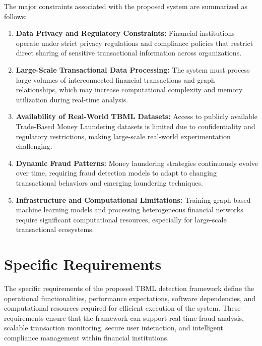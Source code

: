 The major constraints associated with the proposed system are summarized as follows:

\renewcommand{\theenumi}{\roman{enumi}}\renewcommand{\labelenumi}{\textbf{ (\theenumi)}}%
\begin{enumerate}

\item \textbf{Data Privacy and Regulatory Constraints:}  
Financial institutions operate under strict privacy regulations and compliance policies that restrict direct sharing of sensitive transactional information across organizations.

\item \textbf{Large-Scale Transactional Data Processing:}  
The system must process large volumes of interconnected financial transactions and graph relationships, which may increase computational complexity and memory utilization during real-time analysis.

\item \textbf{Availability of Real-World TBML Datasets:}  
Access to publicly available Trade-Based Money Laundering datasets is limited due to confidentiality and regulatory restrictions, making large-scale real-world experimentation challenging.

\item \textbf{Dynamic Fraud Patterns:}  
Money laundering strategies continuously evolve over time, requiring fraud detection models to adapt to changing transactional behaviors and emerging laundering techniques.

\item \textbf{Infrastructure and Computational Limitations:}  
Training graph-based machine learning models and processing heterogeneous financial networks require significant computational resources, especially for large-scale transactional ecosystems.

\end{enumerate}

\section[Specific Requirements]{\textbf{Specific Requirements}}

The specific requirements of the proposed TBML detection framework define the operational functionalities, performance expectations, software dependencies, and computational resources required for efficient execution of the system. These requirements ensure that the framework can support real-time fraud analysis, scalable transaction monitoring, secure user interaction, and intelligent compliance management within financial institutions.

